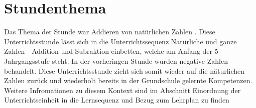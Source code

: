 \chapter{Stundenthema}
Das Thema der Stunde war \glqq Addieren von natürlichen Zahlen \grqq. Diese Unterrichtsstunde lässt sich in die Unterrichtssequenz Natürliche und ganze Zahlen - Addition und Subraktion einbetten, welche am Anfang der 5 Jahrgangsstufe steht. In der vorheringen Stunde wurden negative Zahlen behandelt. Diese Unterrichtsstunde zieht sich somit wieder auf die näturlichen Zahlen zurück und wiederholt bereits in der Grundschule gelernte Kompetenzen. Weitere Infromationen zu diesem Kontext sind im Abschnitt \glqq Einordnung der Unterrichtseinheit \grqq in die Lernsequenz und Bezug zum Lehrplan zu finden